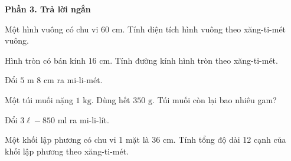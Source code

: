 \textbf{Phần 3. Trả lời ngắn}

\begin{ex} %
Một hình vuông có chu vi $60\text{ cm}$. Tính diện tích hình vuông theo xăng-ti-mét vuông.
\end{ex}

\begin{ex} %
Hình tròn có bán kính $16\text{ cm}$. Tính đường kính hình tròn theo xăng-ti-mét.
\end{ex}

\begin{ex} %
Đổi $5\text{ m } 8\text{ cm}$ ra mi-li-mét.
\end{ex}

\begin{ex} %
Một túi muối nặng $1\text{ kg}$. Dùng hết $350\text{ g}$. Túi muối còn lại bao nhiêu gam?
\end{ex}

\begin{ex} %
Đổi $3\ell - 850\text{ ml}$ ra mi-li-lít.
\end{ex}

\begin{ex} %
Một khối lập phương có chu vi 1 mặt là $36\text{ cm}$. Tính tổng độ dài 12 cạnh của khối lập phương theo xăng-ti-mét.
\end{ex}
